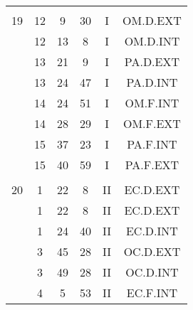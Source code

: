 \documentclass[12pt, a4paper]{article}
\begin{document}
\begin{multicols}{3}
{\begin{tabular}{c c c c c c}
	 	 	 	 & & & & & \\%
	 	 	 	19 & 12 & 9 & 30 & I & OM.D.EXT\\%
	 	 	 	 & 12 & 13 & 8 & I & OM.D.INT\\%
	 	 	 	 & 13 & 21 & 9 & I & PA.D.EXT\\%
	 	 	 	 & 13 & 24 & 47 & I & PA.D.INT\\%
	 	 	 	 & 14 & 24 & 51 & I & OM.F.INT\\%
	 	 	 	 & 14 & 28 & 29 & I & OM.F.EXT\\%
	 	 	 	 & 15 & 37 & 23 & I & PA.F.INT\\%
	 	 	 	 & 15 & 40 & 59 & I & PA.F.EXT\\%
	 	 	 	 & & & & & \\%
	 	 	 	20 & 1 & 22 & 8 & II & EC.D.EXT\\%
	 	 	 	 & 1 & 22 & 8 & II & EC.D.EXT\\%
	 	 	 	 & 1 & 24 & 40 & II & EC.D.INT\\%
	 	 	 	 & 3 & 45 & 28 & II & OC.D.EXT\\%
	 	 	 	 & 3 & 49 & 28 & II & OC.D.INT\\%
	 	 	 	 & 4 & 5 & 53 & II & EC.F.INT\\%
	 	 \end{tabular}
 	}
\end{multicols}
\end{document}
